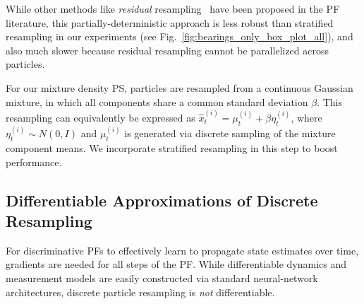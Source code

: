         While other methods like \emph{residual} resampling~\cite{liu1998sequential,douc2005comparison, whitley1994genetic} have been proposed in the PF literature, this partially-deterministic approach is less robust than stratified resampling in our experiments (see Fig.~\ref{fig:bearings_only_box_plot_all}), and also much slower because residual resampling cannot be parallelized across particles.
        
        For our mixture density PS, particles are resampled from a continuous Gaussian mixture, in which all components share a common standard deviation $\beta$.  This resampling can equivalently be expressed as $\hat{x}_t^{(i)} = \mu_t^{(i)} + \beta \eta_t^{(i)}$, where $\eta_t^{(i)} \sim N(0, I)$ and $\mu_t^{(i)}$ is generated via discrete sampling of the mixture component means.  We incorporate stratified resampling in this step to boost performance.




    \subsection{Differentiable Approximations of Discrete Resampling}
        For discriminative PFs to effectively learn to propagate state estimates over time, gradients are needed for all steps of the PF.  While differentiable dynamics and measurement models are easily constructed via standard neural-network architectures, discrete particle resampling is \emph{not} differentiable.

